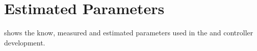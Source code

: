 %
%

\section{Estimated Parameters}\label{sec:parameterResults}
 shows the know, measured and estimated parameters used in the \abbrROV and controller development.

